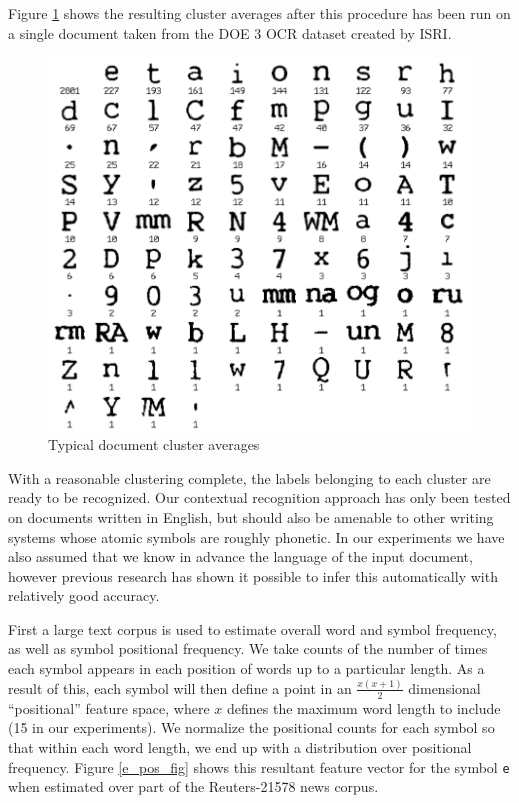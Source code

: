 \documentclass[times, 10pt,twocolumn]{article}
\begin{document}
Figure \ref{clavg_fig} shows the resulting cluster averages after this
procedure has been run on a single document taken from the DOE 3 OCR dataset 
created by ISRI\cite{nartker2005}.

\begin{figure}[ht]
  \centering
  \includegraphics[scale=.4]{figures/cluster_averages}
  \caption{Typical document cluster averages}
  \label{clavg_fig}
\end{figure}



With a reasonable clustering complete, the labels belonging to each cluster are
ready to be recognized.  Our contextual recognition approach has only been
tested on documents written in English, but should also be amenable to other
writing systems whose atomic symbols are roughly phonetic.  In our experiments
we have also assumed that we know in advance the language of the
input document, however previous research has shown it possible to infer this
automatically with relatively good accuracy\cite{sibun1994}.

First a large text corpus is used to estimate overall word and symbol frequency,
as well as symbol positional frequency.  We take counts of the number of times
each symbol appears in each position of words up to a particular length.  As
a result of this, each symbol will then define a point in an $\frac{x
(x+1)}{2}$ dimensional ``positional'' feature space, where $x$ defines the
maximum word length to include (15 in our experiments).  We normalize the
positional counts for each symbol so that within each word length, we end up
with a distribution over positional frequency.  Figure \ref{e_pos_fig} shows
this resultant feature vector for the symbol {\tt e} when estimated over part of
the Reuters-21578 news corpus\cite{lewis2004}.
\end{document}
